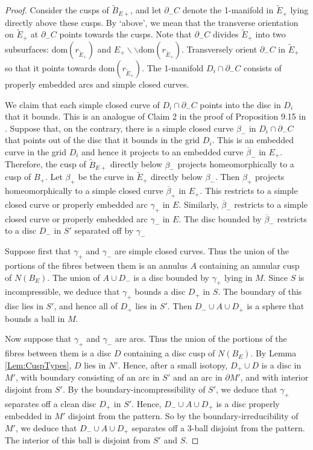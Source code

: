 \documentclass[oneside]{amsart}
\numberwithin{equation}{section}
\theoremstyle{plain}
\theoremstyle{definition}
\newcommand{\cut}{\backslash\backslash}
\begin{document}
\begin{proof}
Consider the cusps of $\tilde B_{E+}$, and let $\partial_- C$
denote the 1-manifold in $\tilde E_+$ lying directly above these cusps. By `above',
we mean that the transverse orientation on $\tilde E_+$ at $\partial_- C$ points towards
the cusps. Note that $\partial_- C$
divides $\tilde E_+$ into two subsurfaces: $\mathrm{dom}(r_{\tilde E_+})$ and $E_+ \cut \mathrm{dom}(r_{\tilde E_+})$.
Transversely orient $\partial_- C$ in $\tilde E_+$ so
that it points towards $\mathrm{dom}(r_{\tilde E_+})$.
The 1-manifold $D_i \cap \partial_-C$ consists of
properly embedded arcs and simple closed curves.

We claim that each simple closed curve of $D_i \cap \partial_-C$
points into the disc in $D_i$ that it bounds.
This is an analogue of Claim 2 in the proof of Proposition 9.15 in \cite{Lackenby:PolyUnknot}.
Suppose that, on the contrary, there is a simple closed curve $\beta_-$ in $D_i \cap \partial_-C$ that points
out of the disc that it bounds in the grid $D_i$. This is an embedded curve in the
grid $D_i$ and hence it projects to an embedded curve $\overline{\beta}_-$ in 
$E_+$. Therefore, the cusp of $\tilde B_{E+}$ directly below $\beta_-$ projects
homeomorphically to a cusp of $B_+$. Let $\beta_+$ be the curve in $\tilde E_+$
directly below $\beta_-$. Then $\beta_+$ projects homeomorphically to a simple
closed curve $\overline{\beta}_+$ in $E_+$. This restricts to a simple closed curve
or properly embedded arc $\gamma_+$ in $E$. Similarly, $\overline{\beta}_-$
restricts to a simple closed curve
or properly embedded arc $\gamma_-$ in $E$. The disc bounded by $\overline{\beta}_-$
restricts to a disc $D_-$ in $S'$ separated off by $\gamma_-$

Suppose first that $\gamma_+$ and $\gamma_-$ are simple closed curves. Thus the union of the portions
of the fibres between them is an annulus $A$ containing an annular cusp of $N(B_E)$.
The union of $A \cup D_-$ is a disc bounded by $\gamma_+$ lying in $M$.
Since $S$ is incompressible, we deduce that $\gamma_+$ bounds a disc $D_+$ in $S$.
The boundary of this disc lies in $S'$, and hence all of $D_+$ lies in $S'$.
Then $D_- \cup A \cup D_+$ is a sphere that bounds a ball in $M$.

Now suppose that $\gamma_+$ and $\gamma_-$ are arcs. Thus the union of the portions
of the fibres between them is a disc $D$ containing a disc cusp of $N(B_E)$.
By Lemma \ref{Lem:CuspTypes}, $D$ lies in $N'$. Hence, after a small isotopy, $D_+ \cup D$
is a disc in $M'$, with boundary consisting of an arc in $S'$ and an arc in $\partial M'$,
and with interior disjoint from $S'$. By the boundary-incompressibility of $S'$,
we deduce that $\gamma_+$ separates off a clean disc $D_+$ in $S'$.
Hence, $D_- \cup A \cup D_+$ is a disc properly embedded in $M'$ disjoint
from the pattern. So by the boundary-irreducibility of $M'$, we deduce that $D_- \cup A \cup D_+$
separates off a 3-ball disjoint from the pattern. The interior of this ball is disjoint from $S'$
and $S$.


\end{proof}
\end{document}
